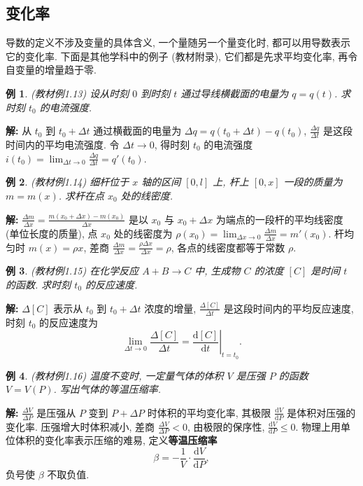 \documentclass[UTF8,openany]{ctexbook}
\theoremstyle{chinesetextbook}
\newtheorem{example}{例}[section]
\newenvironment{cnsolution}{\par\indent\textbf{解:} \ignorespaces}{\par}
\newcommand{\dd}{\mathrm d}
\begin{document}
\subsection{变化率}
导数的定义不涉及变量的具体含义, 一个量随另一个量变化时, 都可以用导数表示它的变化率. 下面是其他学科中的例子 (教材附录), 它们都是先求平均变化率, 再令自变量的增量趋于零.
\begin{example}\label{ex:c2-1-13}
\textnormal{(教材例1.13)} 设从时刻 $0$ 到时刻 $t$ 通过导线横截面的电量为 $q=q(t)$. 求时刻 $t_0$ 的电流强度.
\end{example}
\begin{cnsolution}
从 $t_0$ 到 $t_0+\Delta t$ 通过横截面的电量为 $\Delta q=q(t_0+\Delta t)-q(t_0)$, $\displaystyle\frac{\Delta q}{\Delta t}$ 是这段时间内的平均电流强度. 令 $\Delta t\to0$, 得时刻 $t_0$ 的电流强度 $\displaystyle i(t_0)=\lim_{\Delta t\to0}\frac{\Delta q}{\Delta t}=q'(t_0)$.
\end{cnsolution}
\begin{example}\label{ex:c2-1-14}
\textnormal{(教材例1.14)} 细杆位于 $x$ 轴的区间 $[0,l]$ 上, 杆上 $[0,x]$ 一段的质量为 $m=m(x)$. 求杆在点 $x_0$ 处的线密度.
\end{example}
\begin{cnsolution}
$\displaystyle\frac{\Delta m}{\Delta x}=\frac{m(x_0+\Delta x)-m(x_0)}{\Delta x}$ 是以 $x_0$ 与 $x_0+\Delta x$ 为端点的一段杆的平均线密度 (单位长度的质量), 点 $x_0$ 处的线密度为 $\displaystyle\rho(x_0)=\lim_{\Delta x\to0}\frac{\Delta m}{\Delta x}=m'(x_0)$. 杆均匀时 $m(x)=\rho x$, 差商 $\displaystyle\frac{\Delta m}{\Delta x}=\frac{\rho\Delta x}{\Delta x}=\rho$, 各点的线密度都等于常数 $\rho$.
\end{cnsolution}
\begin{example}\label{ex:c2-1-15}
\textnormal{(教材例1.15)} 在化学反应 $A+B\to C$ 中, 生成物 $C$ 的浓度 $[C]$ 是时间 $t$ 的函数. 求时刻 $t_0$ 的反应速度.
\end{example}
\begin{cnsolution}
$\Delta[C]$ 表示从 $t_0$ 到 $t_0+\Delta t$ 浓度的增量, $\displaystyle\frac{\Delta[C]}{\Delta t}$ 是这段时间内的平均反应速度, 时刻 $t_0$ 的反应速度为
\[
\lim_{\Delta t\to0}\frac{\Delta[C]}{\Delta t}=\left.\frac{\dd[C]}{\dd t}\right|_{t=t_0}.
\]
\end{cnsolution}
\begin{example}\label{ex:c2-1-16}
\textnormal{(教材例1.16)} 温度不变时, 一定量气体的体积 $V$ 是压强 $P$ 的函数 $V=V(P)$. 写出气体的等温压缩率.
\end{example}
\begin{cnsolution}
$\displaystyle\frac{\Delta V}{\Delta P}$ 是压强从 $P$ 变到 $P+\Delta P$ 时体积的平均变化率, 其极限 $\displaystyle\frac{\dd V}{\dd P}$ 是体积对压强的变化率. 压强增大时体积减小, 差商 $\displaystyle\frac{\Delta V}{\Delta P}<0$, 由极限的保序性, $\displaystyle\frac{\dd V}{\dd P}\le0$. 物理上用单位体积的变化率表示压缩的难易, 定义\textbf{等温压缩率}
\[
\beta=-\frac1V\cdot\frac{\dd V}{\dd P},
\]
负号使 $\beta$ 不取负值.
\end{cnsolution}
\end{document}
